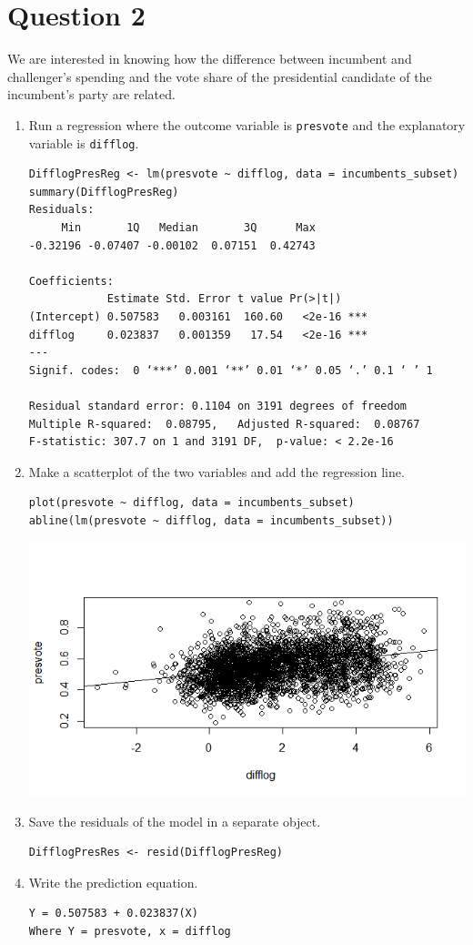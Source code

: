 \documentclass[12pt,letterpaper]{article}
\begin{document}
\newpage

\section*{Question 2}
\noindent We are interested in knowing how the difference between incumbent and challenger's spending and the vote share of the presidential candidate of the incumbent's party are related.	\vspace{.25cm}
	\begin{enumerate}
		\item Run a regression where the outcome variable is \texttt{presvote} and the explanatory variable is \texttt{difflog}.	
\begin{verbatim}
DifflogPresReg <- lm(presvote ~ difflog, data = incumbents_subset)
summary(DifflogPresReg)
Residuals:
     Min       1Q   Median       3Q      Max 
-0.32196 -0.07407 -0.00102  0.07151  0.42743 

Coefficients:
            Estimate Std. Error t value Pr(>|t|)    
(Intercept) 0.507583   0.003161  160.60   <2e-16 ***
difflog     0.023837   0.001359   17.54   <2e-16 ***
---
Signif. codes:  0 ‘***’ 0.001 ‘**’ 0.01 ‘*’ 0.05 ‘.’ 0.1 ‘ ’ 1

Residual standard error: 0.1104 on 3191 degrees of freedom
Multiple R-squared:  0.08795,	Adjusted R-squared:  0.08767 
F-statistic: 307.7 on 1 and 3191 DF,  p-value: < 2.2e-16
\end{verbatim}
\vspace{5cm}
		\item Make a scatterplot of the two variables and add the regression line.
\begin{verbatim}
plot(presvote ~ difflog, data = incumbents_subset)
abline(lm(presvote ~ difflog, data = incumbents_subset))
\end{verbatim}
\includegraphics[width=.75\textwidth]{Rplot2}

\vspace{5cm}
		\item Save the residuals of the model in a separate object.
\begin{verbatim}
DifflogPresRes <- resid(DifflogPresReg)
\end{verbatim}
	\vspace{5cm}
		\item Write the prediction equation.
\begin{verbatim}
Y = 0.507583 + 0.023837(X)
Where Y = presvote, x = difflog
\end{verbatim}


	\end{enumerate}
	
\end{document}
